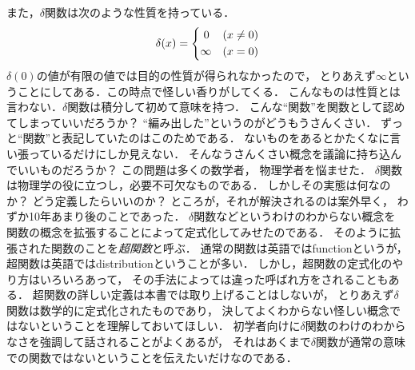 また，$\delta$関数は次のような性質を持っている．
\begin{align}
\delta ( x) = \left \{
\begin{aligned} 
0 \hspace{4.2mm} & (x \neq 0) \\
\infty \quad & (x = 0)
\end{aligned}
\right.
\label{eq:deltainfty}
\end{align}
$\delta(0)$の値が有限の値では目的の性質が得られなかったので，
とりあえず$\infty$ということにしてある．この時点で怪しい香りがしてくる．
こんなものは性質とは言わない．$\delta$関数は積分して初めて意味を持つ．
こんな``関数''を関数として認めてしまっていいだろうか？ ``編み出した''というのがどうもうさんくさい．
ずっと``関数''と表記していたのはこのためである．
ないものをあるとかたくなに言い張っているだけにしか見えない．
そんなうさんくさい概念を議論に持ち込んでいいものだろうか？ この問題は多くの数学者，
物理学者を悩ませた．
$\delta$関数は物理学の役に立つし，必要不可欠なものである．
しかしその実態は何なのか？ どう定義したらいいのか？ ところが，それが解決されるのは案外早く，
わずか10年あまり後のことであった．
$\delta$関数などというわけのわからない概念を
関数の概念を拡張することによって定式化してみせたのである．
そのように拡張された関数のことを\emph{超関数}と呼ぶ．
通常の関数は英語ではfunctionというが，
超関数は英語ではdistributionということが多い．
しかし，超関数の定式化のやり方はいろいろあって，
その手法によっては違った呼ばれ方をされることもある．
超関数の詳しい定義は本書では取り上げることはしないが，
とりあえず$\delta$関数は数学的に定式化されたものであり，
決してよくわからない怪しい概念ではないということを理解しておいてほしい．
初学者向けに$\delta$関数のわけのわからなさを強調して話されることがよくあるが，
それはあくまで$\delta$関数が通常の意味での関数ではないということを伝えたいだけなのである．

